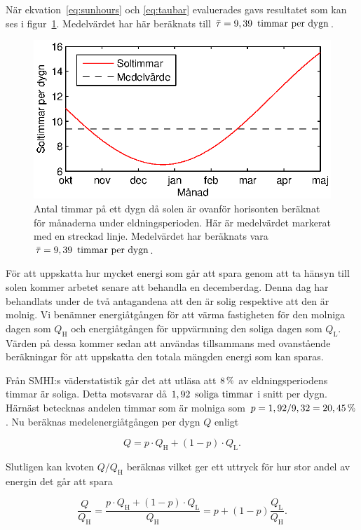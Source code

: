 När ekvation~\eqref{eq:sunhours} och \eqref{eq:taubar} evaluerades gavs 
resultatet som kan ses i figur~\ref{fig:sunhours}.
Medelvärdet har här beräknats till $\bar{\tau}=\unit[9,39]{~timmar~per~dygn}$.
\begin{figure}
\centering
\includegraphics{images/sunhours.eps}
\caption{Antal timmar på ett dygn då solen är ovanför horisonten beräknat för månaderna under eldningsperioden.
Här är medelvärdet markerat med en streckad linje. Medelvärdet har beräknats vara
$\bar{\tau}=\unit[9,39]{~timmar~per~dygn}$.}
\label{fig:sunhours}
\end{figure}

\noindent
För att uppskatta hur mycket energi som går att spara genom att ta hänsyn till solen kommer arbetet
senare att behandla en decemberdag. Denna dag har behandlats under de två antagandena att den är solig respektive att den är molnig. Vi benämner energiåtgången för att värma fastigheten för den molniga dagen som $Q_\text{H}$ och energiåtgången för uppvärmning den soliga dagen som 
$Q_\text{L}$. Värden på dessa kommer sedan att användas tillsammans med
ovanstående beräkningar för att uppskatta den totala mängden energi som kan sparas. 

Från SMHI:s väderstatistik går det att utläsa att $\unit[8]{\%}$ av eldningsperiodens timmar är soliga\cite{SMHIdata}.
Detta motsvarar då $\unit[1,92]{~soliga~timmar}$ i snitt per dygn. Härnäst betecknas andelen timmar som är molniga som
$p = 1,92/9,32 = \unit[20,45]{\%}$. Nu beräknas medelenergiåtgången per dygn $Q$ enligt

\begin{equation}
Q = p\cdot Q_\text{H} + (1-p)\cdot Q_\text{L}.
\end{equation}

Slutligen kan kvoten $Q/Q_\text{H}$ beräknas vilket ger ett uttryck för hur stor andel av energin det går att spara

\begin{equation}
\frac{Q}{Q_\text{H}} = \frac{p\cdot Q_\text{H} + (1-p)\cdot Q_\text{L}}{Q_\text{H}} = p+(1-p)\frac{Q_\text{L}}{Q_\text{H}}.
\end{equation}
